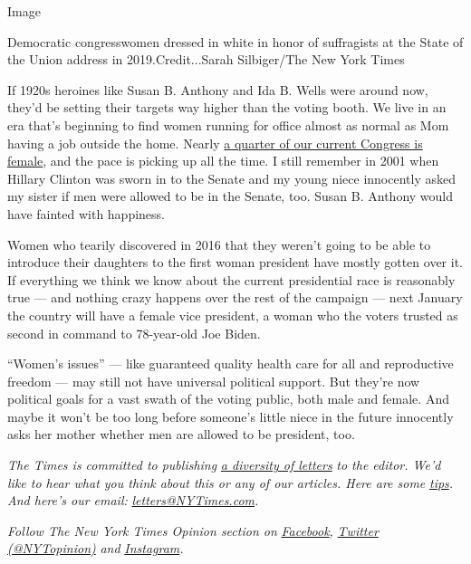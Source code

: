Image

Democratic congresswomen dressed in white in honor of suffragists at the
State of the Union address in 2019.Credit...Sarah Silbiger/The New York
Times

If 1920s heroines like Susan B. Anthony and Ida B. Wells were around
now, they'd be setting their targets way higher than the voting booth.
We live in an era that's beginning to find women running for office
almost as normal as Mom having a job outside the home. Nearly
\href{https://cawp.rutgers.edu/current-numbers}{a quarter of our current
Congress is female}, and the pace is picking up all the time. I still
remember in 2001 when Hillary Clinton was sworn in to the Senate and my
young niece innocently asked my sister if men were allowed to be in the
Senate, too. Susan B. Anthony would have fainted with happiness.

Women who tearily discovered in 2016 that they weren't going to be able
to introduce their daughters to the first woman president have mostly
gotten over it. If everything we think we know about the current
presidential race is reasonably true --- and nothing crazy happens over
the rest of the campaign --- next January the country will have a female
vice president, a woman who the voters trusted as second in command to
78-year-old Joe Biden.

``Women's issues'' --- like guaranteed quality health care for all and
reproductive freedom --- may still not have universal political support.
But they're now political goals for a vast swath of the voting public,
both male and female. And maybe it won't be too long before someone's
little niece in the future innocently asks her mother whether men are
allowed to be president, too.

\emph{The Times is committed to publishing}
\href{https://www.nytimes3xbfgragh.onion/2019/01/31/opinion/letters/letters-to-editor-new-york-times-women.html}{\emph{a
diversity of letters}} \emph{to the editor. We'd like to hear what you
think about this or any of our articles. Here are some}
\href{https://help.nytimes3xbfgragh.onion/hc/en-us/articles/115014925288-How-to-submit-a-letter-to-the-editor}{\emph{tips}}\emph{.
And here's our email:}
\href{mailto:letters@NYTimes.com}{\emph{letters@NYTimes.com}}\emph{.}

\emph{Follow The New York Times Opinion section on}
\href{https://www.facebookcorewwwi.onion/nytopinion}{\emph{Facebook}}\emph{,}
\href{http://twitter.com/NYTOpinion}{\emph{Twitter (@NYTopinion)}}
\emph{and}
\href{https://www.instagram.com/nytopinion/}{\emph{Instagram}}\emph{.}

